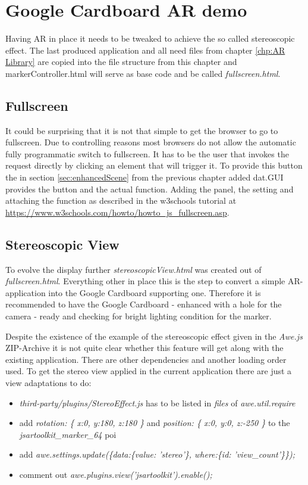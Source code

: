 \chapter{Google Cardboard AR demo}
\label{chp:Google Cardboard AR demo}

Having AR in place it needs to be tweaked to achieve the so called stereoscopic effect. The last produced application and all need files from chapter \ref{chp:AR Library} are copied into the file structure from this chapter and {markerController.html} will serve as base code and be called \textit{fullscreen.html}.

\section{Fullscreen}
\label{sec:fullscreen}

It could be surprising that it is not that simple to get the browser to go to fullscreen. Due to controlling reasons most browsers do not allow the automatic fully programmatic switch to fullscreen. It has to be the user that invokes the request directly by clicking an element that will trigger it. To provide this button the in section \ref{sec:enhancedScene} from the previous chapter added {dat.GUI} provides the button and the actual function. Adding the panel, the setting and attaching the function as described in the w3schools tutorial at \url{https://www.w3schools.com/howto/howto_js_fullscreen.asp}.


\section{Stereoscopic View}

To evolve the display further \textit{stereoscopicView.html} was created out of  \textit{fullscreen.html}. Everything other in place this is the step to convert a simple AR-application into the Google Cardboard supporting one. Therefore it is recommended to have the Google Cardboard - enhanced with a hole for the camera - ready and checking for bright lighting condition for the marker.

Despite the existence of the example of the stereoscopic effect given in the \textit{Awe.js} ZIP-Archive it is not quite clear whether this feature will get along with the existing application. There are other dependencies and another loading order used. To get the stereo view applied in the current application there are just a view adaptations to do:
\begin{itemize}
\item \textit{third-party/plugins/StereoEffect.js} has to be listed in \textit{files} of \textit{awe.util.require}
\item add \textit{rotation: \{ x:0, y:180, z:180 \}} and  \textit{position: \{ x:0, y:0, z:-250 \}} to the \textit{jsartoolkit\_marker\_64} poi
\item add \textit{awe.settings.update(\{data:\{value: 'stereo'\}, where:\{id: 'view\_count'\}\});}
\item comment out \textit{awe.plugins.view('jsartoolkit').enable();}
\end{itemize}

